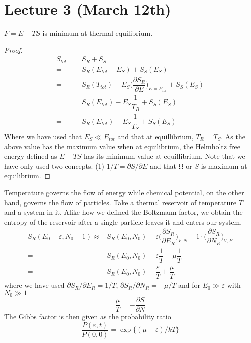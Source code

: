 \section{Lecture 3 (March 12th)}
\begin{thm}
$F=E-TS$ is minimum at thermal equilibrium.
\end{thm}
\vspace{2ex}
\begin{proof}
\begin{align*}
	S_{tot}=&S_{R}+S_{S}\\
	=&S_{R}(E_{tot}-E_{S})+S_{S}(E_{S})\\
	=&S_{R}(T_{tot})-E_{S}\Big(\dfrac{\partial S_{R}}{\partial E} \Big)_{E=E_{tot}}+S_{S}(E_{S})\\
	=&S_{R}(E_{tot})-E_{S}\dfrac{1}{T_{R}}+S_{S}(E_{S})\\
	=&S_{R}(E_{tot})-E_{S}\dfrac{1}{T_{S}}+S_{S}(E_{S})
\end{align*}
Where we have used that $E_{S}\ll E_{tot}$ and that at equillibrium, $T_{R}=T_{S}$. As the above value has the maximum value when at equilibrium, the Helmholtz free energy defined as $E-TS$ has its minimum value at equillibrium. Note that we have only used two concepts. (1) $1/T=\partial S/\partial E$ and that $\mathrm{\Omega} $ or $S$ is maximum at equilibrium.
\end{proof}
\vspace{2ex}
\begin{defi}
Temperature governs the flow of energy while chemical potential, on the other hand, governs the flow of particles. Take a thermal reservoir of temperature $T$ and a system in it. Alike how we defined the Boltzmann factor, we obtain the entropy of the reservoir after a single particle leaves it and enters our system.
\begin{align*}
	S_{R}(E_0-\varepsilon ,N_0-1)\approx & S_{R}(E_{0},N_0)-\varepsilon \Big(\dfrac{\partial S_{R}}{\partial E_{R}} \Big)_{V,N}-1\cdot \Big(\dfrac{\partial S_{R}}{\partial N_{R}} \Big)_{V,E}\\
	=&S_{R}(E_{0},N_{0})-\varepsilon \dfrac{1}{T}+\mu \dfrac{1}{T}\\
	=&S_{R}(E_{0},N_{0})-\dfrac{\varepsilon }{T}+\dfrac{\mu }{T}
\end{align*}
where we have used $\partial S_{R}/\partial E_{R}=1/T$, $\partial S_{R}/\partial N_{R}=-\mu /T$ and for $E_{0}\gg \varepsilon $ with $N_{0}\gg 1$
\[\dfrac{\mu }{T}=-\dfrac{\partial S}{\partial N} \]
The Gibbs factor is then given as the probability ratio
\[\dfrac{P(\varepsilon ,t)}{P(0,0)}=\exp\{(\mu -\varepsilon )/kT\}\]
\end{defi}
